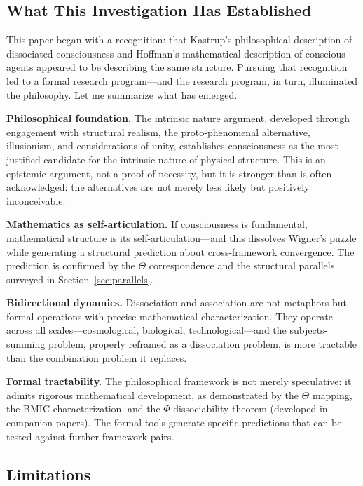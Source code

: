 \documentclass[11pt,a4paper]{article}
\theoremstyle{definition}
\theoremstyle{plain}
\theoremstyle{remark}
\begin{document}
\subsection{What This Investigation Has Established}

This paper began with a recognition: that Kastrup's philosophical description of dissociated consciousness and Hoffman's mathematical description of conscious agents appeared to be describing the same structure. Pursuing that recognition led to a formal research program---and the research program, in turn, illuminated the philosophy. Let me summarize what has emerged.

\textbf{Philosophical foundation.} The intrinsic nature argument, developed through engagement with structural realism, the proto-phenomenal alternative, illusionism, and considerations of unity, establishes consciousness as the most justified candidate for the intrinsic nature of physical structure. This is an epistemic argument, not a proof of necessity, but it is stronger than is often acknowledged: the alternatives are not merely less likely but positively inconceivable.

\textbf{Mathematics as self-articulation.} If consciousness is fundamental, mathematical structure is its self-articulation---and this dissolves Wigner's puzzle while generating a structural prediction about cross-framework convergence. The prediction is confirmed by the $\Theta$ correspondence and the structural parallels surveyed in Section~\ref{sec:parallels}.

\textbf{Bidirectional dynamics.} Dissociation and association are not metaphors but formal operations with precise mathematical characterization. They operate across all scales---cosmological, biological, technological---and the subjects-summing problem, properly reframed as a dissociation problem, is more tractable than the combination problem it replaces.

\textbf{Formal tractability.} The philosophical framework is not merely speculative: it admits rigorous mathematical development, as demonstrated by the $\Theta$ mapping, the BMIC characterization, and the $\Phi$-dissociability theorem (developed in companion papers). The formal tools generate specific predictions that can be tested against further framework pairs.

\subsection{Limitations}
\end{document}
